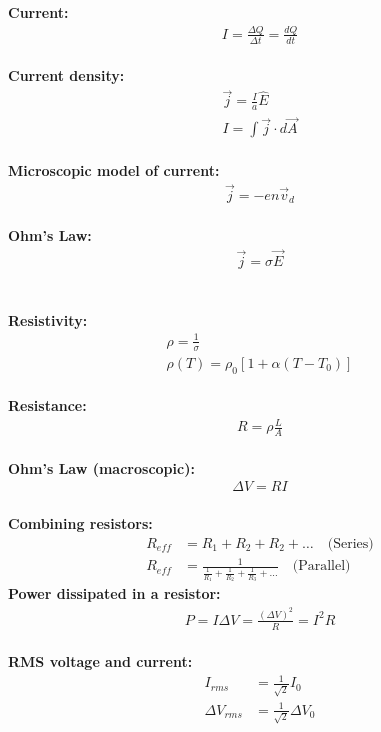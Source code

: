 \newpage
\begin{importantEquations}
\begin{multicols}{2}
\textbf{Current:}
\begin{align*}
I = \frac{\Delta Q}{\Delta t}=\frac{dQ}{dt}
\end{align*}
\\
\textbf{Current density:}
\begin{align*}
\vec j = \frac{I}{a}\hat E \\
I = \int \vec j \cdot d \vec A
\end{align*}
\\
\textbf{Microscopic model of current:}
\begin{align*}
\vec j = -en \vec v_d
\end{align*}
\\
\textbf{Ohm's Law:}
\begin{align*}
\vec j = \sigma \vec E
\end{align*}
\\
\columnbreak
\\
\textbf{Resistivity:}
\begin{align*}
\rho = \frac{1}{\sigma}\\
\rho(T)=\rho_0[1+\alpha(T-T_0)]
\end{align*}
\\
\textbf{Resistance:}
\begin{align*}
R = \rho \frac{L}{A}
\end{align*}
\\
\textbf{Ohm's Law (macroscopic):}
\begin{align*}
\Delta V = R I
\end{align*}
\\
\textbf{Combining resistors:}
\begin{align*}
R_{eff}&=R_1+R_2+R_2+\dots\quad\text{(Series)}\\
R_{eff}&=\frac{1}{\frac{1}{R_1}+\frac{1}{R_2}+\frac{1}{R_3}+\dots}\quad\text{(Parallel)}
\end{align*}
\textbf{Power dissipated in a resistor:}
\begin{align*}
P=I \Delta V=\frac{(\Delta V)^2}{R}=I^2R
\end{align*}
\\
\textbf{RMS voltage and current:}
\begin{align*}
I_{rms}&=\frac{1}{\sqrt 2}I_0\\
\Delta V_{rms}&=\frac{1}{\sqrt 2}\Delta V_0
\end{align*}
\\
\end{multicols}
\end{importantEquations}
